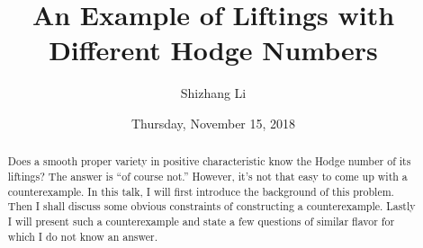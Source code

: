 \documentclass{UAmathtalk}
\author{Shizhang Li}
\title{An Example of Liftings with Different Hodge Numbers}
\date{Thursday, November 15, 2018}
\begin{document}
\maketitle

\begin{abstract}
Does a smooth proper variety in positive characteristic know the Hodge number of its liftings? The answer is ``of course not.'' However, it's not that easy to come up with a counterexample. In this talk, I will first introduce the background of this problem. Then I shall discuss some obvious constraints of constructing a counterexample. Lastly I will present such a counterexample and state a few questions of similar flavor for which I do not know an answer.
\end{abstract}
\end{document}
